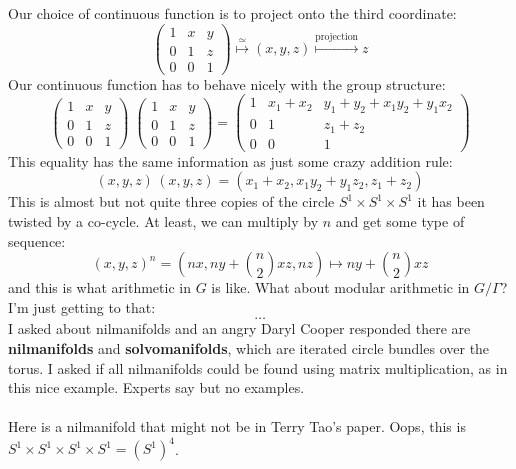 \documentclass[12pt]{article}
\begin{document}
\noindent Our choice of continuous function is to project onto the third coordinate:
$$ \left( \begin{array}{ccc} 1 & x & y \\ 0 & 1 & z \\ 0 & 0 & 1 \end{array} \right) 
\stackrel{\simeq}{\mapsto} (x,y,z) \stackrel{\text{projection}}{\mapsto} z $$
Our continuous function has to behave nicely with the group structure:
$$ \left( \begin{array}{ccc} 1 & x & y \\ 0 & 1 & z \\ 0 & 0 & 1 \end{array} \right)  \; \left( \begin{array}{ccc} 1 & x & y \\ 0 & 1 & z \\ 0 & 0 & 1 \end{array} \right)  
= \left( \begin{array}{ccc} 1 & x_1 + x_2 & y_1 + y_2 + x_1 y_2 + y_1 x_2 \\ 0 & 1 & z_1 + z_2 \\ 0 & 0 & 1 \end{array} \right) $$
This equality has the same information as just some crazy addition rule:
$$ (x,y,z) \,(x,y,z) = (x_1 + x_2, x_1 y_2 + y_1 z_2 , z_1 + z_2 )  $$
This is almost but not quite three copies of the circle $S^1 \times S^1 \times S^1 $ it has been twisted by a co-cycle.  At least, we can multiply by $n$ and get some type of sequence:
$$ (x,y,z)^n = (n x,  ny + \binom{n}{2} x z , nz) \mapsto ny + \binom{n}{2} x z $$
and this is what arithmetic in $G$ is like.  What about modular arithmetic in $G/\Gamma$?  I'm just getting to that:
$$ \dots $$
I asked about nilmanifolds and an angry Daryl Cooper responded there are \textbf{nilmanifolds} and \textbf{solvomanifolds}, which are iterated circle bundles over the torus.  I asked if all nilmanifolds could be found using matrix multiplication, as in this nice example.  Experts say  but no examples. \\ \\
Here is a nilmanifold that might not be in Terry Tao's paper. Oops, this is $S^1 \times S^1 \times S^1 \times S^1 = (S^1)^4$. 
\end{document}
